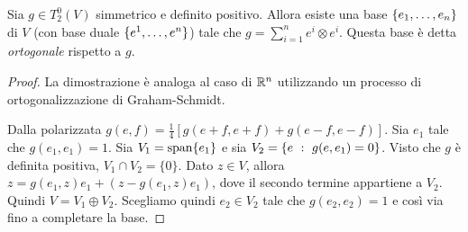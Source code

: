 \begin{proposition}
	Sia $g\in T^0_2(V)$ simmetrico e definito positivo. Allora esiste una base $\{\seqb en,\}$ di $V$ (con base duale $\{\seqa en,\}$) tale che $g = \sum_{i=1}^n e^i\otimes e^i$. Questa base è detta \emph{ortogonale} rispetto a $g$.
\end{proposition}
\begin{proof}
	La dimostrazione è analoga al caso di $\R^n$ utilizzando un processo di ortogonalizzazione di Graham-Schmidt.
	
	Dalla polarizzata $g(e,f) = \frac 14 [g(e+f,e+f) + g(e-f,e-f)]$.
	Sia $e_1$ tale che $g(e_1,e_1) = 1$. Sia $V_1 = \spanrm \{e_1\}$ e sia $V_2 = \{e \suchthat g(e,e_1) = 0\}$.
	Visto che $g$ è definita positiva, $V_1\cap V_2= \{0\}$. Dato $z\in V$, allora $z = g(e_1,z)e_1 + (z-g(e_1,z)e_1)$, dove il secondo termine appartiene a $V_2$. Quindi $V = V_1\oplus V_2$.
	Scegliamo quindi $e_2\in V_2$ tale che $g(e_2,e_2)=1$ e così via fino a completare la base.
\end{proof}


